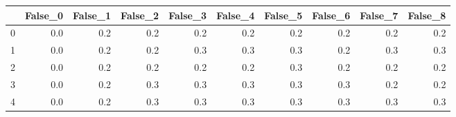\begin{tabular}{lrrrrrrrrr}
\toprule
{} &  False\_0 &  False\_1 &  False\_2 &  False\_3 &  False\_4 &  False\_5 &  False\_6 &  False\_7 &  False\_8 \\ \hline
\midrule
0 &      0.0 &      0.2 &      0.2 &      0.2 &      0.2 &      0.2 &      0.2 &      0.2 &      0.2 \\ \hline
1 &      0.0 &      0.2 &      0.2 &      0.3 &      0.3 &      0.3 &      0.2 &      0.3 &      0.3 \\ \hline
2 &      0.0 &      0.2 &      0.2 &      0.2 &      0.2 &      0.3 &      0.2 &      0.2 &      0.2 \\ \hline
3 &      0.0 &      0.2 &      0.3 &      0.3 &      0.3 &      0.3 &      0.3 &      0.2 &      0.2 \\ \hline
4 &      0.0 &      0.2 &      0.3 &      0.3 &      0.3 &      0.3 &      0.3 &      0.3 &      0.3 \\ \hline
\bottomrule
\end{tabular}
